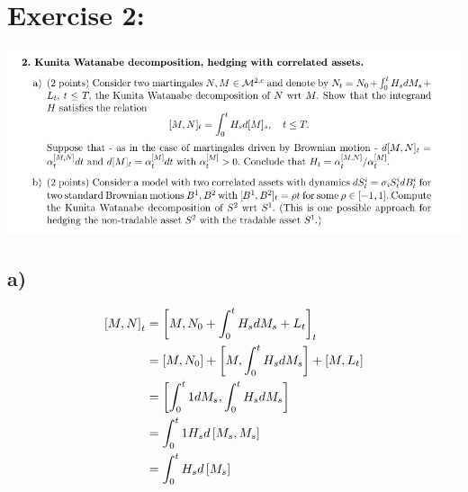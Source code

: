 \documentclass[document.tex]{subfiles}
\begin{document}
\section*{Exercise 2:}


\includegraphics[width=\textwidth]{ex2.png}
\subsection*{a)}
\begin{align*}
	\left[M , N \right]_t &= \left[M , N_0 + \int_0^t H_s dM_s + L_t \right]_t\\
	&= \left[M , N_0 \right] + \left[M , \int_0^t H_s dM_s \right] + \left[M , L_t \right]\\
	&= \left[\int_0^t 1 dM_s , \int_0^t H_s dM_s \right]\\
	&= \int_0^t 1 H_s d \left[M_s , M_s \right]\\
	&= \int_0^t H_s d \left[ M_s \right]
\end{align*}
\end{document}
